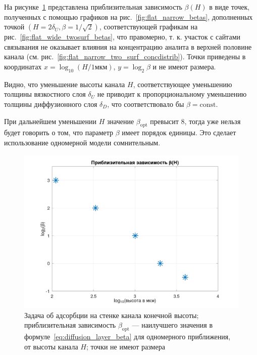 \documentclass[oneside,final,12pt]{extreport}
\begin{document}
На рисунке~\ref{fig:flat_narrow_beta_height} представлена
приблизительная зависимость $\beta\left(H\right)$ в виде точек,
полученных с помощью графиков на рис.~\ref{fig:flat_narrow_betas},
дополненных точкой $\left(H = 2\delta_U, \beta = 1/\sqrt{2}\right)$,
соответствующей графикам на рис.~\ref{fig:flat_wide_twosurf_betas},
что правомерно, т. к. участок с сайтами связывания не оказывает влияния
на концентрацию аналита в верхней половине канала
(см. рис.~\ref{fig:flat_narrow_two_surf_concdistrib}).
Точки приведены в координатах
$x = \log_{10}{\left(H/1\text{мкм}\right)}$, $y = \log_{2}{\beta}$
и не имеют размера.

Видно, что уменьшение высоты канала $H$, соответствующее уменьшению толщины
вязкостного слоя $\delta_U$ не приводит к пропорциональному уменьшению
толщины диффузионного слоя $\delta_D$, что соответствовало бы $\beta = \text{const}$.

При дальнейшем уменьшении $H$ значение $\beta_\text{opt}$ превысит $8$,
тогда уже нельзя будет говорить о том, что параметр $\beta$ имеет порядок единицы.
Это сделает использование одномерной модели сомнительным.

\begin{figure}
  \centering
  \includegraphics[width=.8\textwidth]{pic/flat_narrow_beta_height}

  \caption{%
    \label{fig:flat_narrow_beta_height}%
    Задача об адсорбции на стенке канала конечной высоты;
    приблизительная зависимость
    $\beta_\text{opt}$ --- наилучшего значения в формуле~\eqref{eq:diffusion_layer_beta}
    для одномерного приближения, от высоты канала $H$;
    точки не имеют размера
  }

\end{figure}
\end{document}
